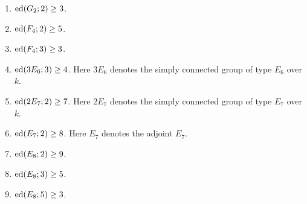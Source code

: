 \begin{thm} \label{thm6.1-1}
\begin{enumerate}
\item $\operatorname{ed}(G_2; 2) \geq 3$.
\item $\operatorname{ed}(F_4; 2) \geq 5$.
\item $\operatorname{ed}(F_4; 3) \geq 3$.
\item $\operatorname{ed}(3E_6; 3) \geq 4$. Here $3E_6$ denotes the simply connected 
group of type $E_6$ over $k$.
\item $\operatorname{ed}(2E_7; 2) \geq 7$. Here $2E_7$ denotes the simply connected 
group of type $E_7$ over $k$.
\item $\operatorname{ed}(E_7; 2) \geq 8$.  Here $E_7$ denotes the adjoint $E_7$.
\item $\operatorname{ed}(E_8; 2) \geq 9$.
\item $\operatorname{ed}(E_8; 3) \geq 5$.
\item $\operatorname{ed}(E_8; 5) \geq 3$.
\end{enumerate}
\end{thm}

